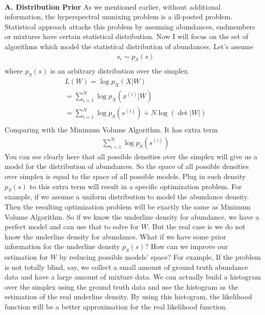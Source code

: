 \documentclass[14pt]{book}
\begin{document}
 \\
{\bf A. Distribution Prior} 
As we mentioned earlier, without additional information, the hyperspectral unmixing problem is a ill-posted problem. 
Statistical approach attacks this problem by assuming abundances, endmembers  or mixtures have certain statistical distribution. Now I will focus on the set of algorithms which model the statistical distribution of abundances. Let's assume 
\begin{equation}
\begin{aligned}
& s_i\sim p_S(s )\\
\end{aligned}
\end{equation}
where $p_S(s)$ is an arbitrary distribution over the simplex. 
\begin{equation}
\begin{aligned}
& L(W) = \log p_X(X | W) \\
&  =\sum_{i=1}^N \log p_X(x^{(i)} | W)\\
&  =\sum_{i=1}^N \log p_S(s^{(i)})+N\log(\det|W|)\\
\end{aligned}
\end{equation}
Comparing with the Minimum Volume Algorithm. It has extra term 
\begin{equation}
\begin{aligned}
& \sum_{i=1}^N \log p_S(s^{(i)})
\end{aligned}
\end{equation}
You can see clearly here that all possible densities over the simplex will give us a model for the distribution of abundances. 
So the space of all possible densities over simplex is equal to the space of all possible models.
Plug in such density $p_S(s)$ to this extra term will result in a specific optimization problem. For example, if we assume a uniform distribution to model the abundance density. Then the resulting optimization problem will be exactly the same as 
Minimum Volume Algorithm. So if we know the underline density for abundance, we have a perfect model and can use that to solve for $W$.  But the real case is we do not know the underline density for abundance. What if we have some prior information for the underline density $p_S(s)$? How can we improve our estimation for $W$
by reducing possible models' space? For example, If the problem is not totally blind, say, we collect a small amount of ground truth abundance data and have a large amount of mixture data. We can actually build a histogram over the simplex using the ground truth data and use the histogram as the estimation of the real underline density.  By using this histogram, the likelihood function will be a better approximation for the real likelihood function.  
\end{document}
